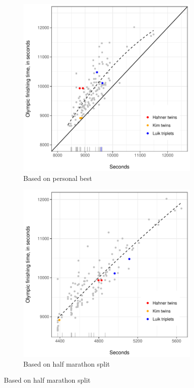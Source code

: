 \documentclass[12pt,titlepage]{article}
\begin{document}
\begin{figure}[!ht]
  \centering
  \caption{Olympic finishing times as a function of underlying marathon talent}
  \label{fig:scatter}
  \begin{subfigure}{.495\textwidth}
    \centering
    \includegraphics[width=\textwidth, keepaspectratio]{scatter_plot.pdf}
    \caption{Based on personal best} 
    \label{fig:45degreeplot}
  \end{subfigure}
  \begin{subfigure}{.495\textwidth}
    \centering
    \includegraphics[width=\textwidth, keepaspectratio]{scatter_plot_half.pdf}
    \caption{Based on half marathon split} 
    \label{fig:45degreeplot_half}
  \end{subfigure}
\end{figure}
\end{document}
